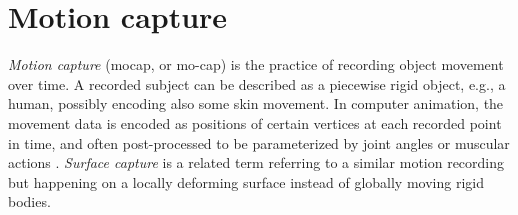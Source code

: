 


%
%
%
%
%

\clearpage
\section{Motion capture} \label{sec:motioncapture} %

\emph{Motion capture} (mocap, or mo-cap) is the practice of recording object movement over time.
A recorded subject can be described as a piecewise rigid object, e.g., a human, possibly encoding also some skin movement.
In computer animation, the movement data is encoded as positions of certain vertices at each recorded point in time, and often post-processed to be parameterized by joint angles or muscular actions \cite{deng2007computer,waters1987muscle}.
\emph{Surface capture} is a related term referring to a similar motion recording but happening on a locally deforming surface instead of globally moving rigid bodies.


